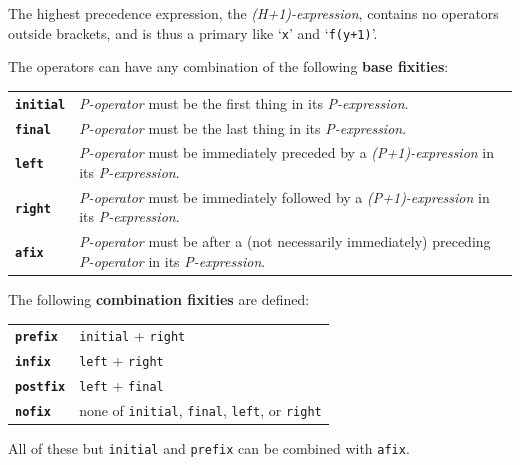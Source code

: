 \documentclass[12pt]{article}
\newcommand{\key}[1]{{\rm \bfseries #1}}
\newcommand{\ttkey}[1]{{\tt \bfseries #1}}
\begin{document}
The highest precedence expression, the {\em (H+1)-expression}, contains
no operators outside brackets, and is thus a primary like `{\tt x}' and
`{\tt f(y+1)}'.

The operators can have any combination of the following \key{base fixities}:

\begin{center}
\begin{tabular}{lp{5.0in}}
\ttkey{initial}	& {\em P-operator} must be the first thing
                  in its {\em P-expression}. \\
\ttkey{final}	& {\em P-operator} must be the last thing
                  in its {\em P-expression}. \\
\ttkey{left}	& {\em P-operator} must be immediately
                  preceded by a {\em (P+1)-expression}
                  in its {\em P-expression}. \\
\ttkey{right}	& {\em P-operator} must be immediately
                  followed by a {\em (P+1)-expression}
                  in its {\em P-expression}. \\
\ttkey{afix}	& {\em P-operator} must be after a (not necessarily
                  immediately) preceding {\em P-operator}
                  in its {\em P-expression}. \\
\end{tabular}
\end{center}

The following \key{combination fixities} are defined:

\begin{center}
\begin{tabular}{ll}
\ttkey{prefix}	& {\tt initial} + {\tt right} \\
\ttkey{infix}	& {\tt left} + {\tt right} \\
\ttkey{postfix}	& {\tt left} + {\tt final} \\
\ttkey{nofix}	& none of {\tt initial}, {\tt final}, {\tt left},
                  or {\tt right} \\
\end{tabular}
\end{center}

All of these but {\tt initial} and {\tt prefix} can be combined with {\tt afix}.

\newpage
\end{document}

